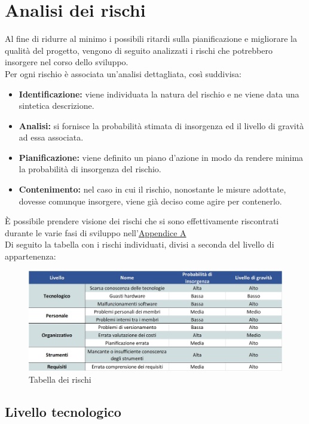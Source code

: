 \newpage
\section{Analisi dei rischi}

Al fine di ridurre al minimo i possibili ritardi sulla pianificazione e migliorare la qualità del progetto, vengono di seguito analizzati i rischi che potrebbero insorgere nel corso dello sviluppo.\\
Per ogni rischio è associata un'analisi dettagliata, così suddivisa:

\begin{itemize}
	\item \textbf{Identificazione:} viene individuata la natura del rischio e ne viene data una sintetica descrizione.
	\item \textbf{Analisi:} si fornisce la probabilità stimata di insorgenza ed il livello di gravità ad essa associata.
	\item \textbf{Pianificazione:} viene definito un piano d'azione in modo da rendere minima la probabilità di insorgenza del rischio. 
	\item \textbf{Contenimento:} nel caso in cui il rischio, nonostante le misure adottate, dovesse comunque insorgere, viene già deciso come agire per contenerlo.
\end{itemize}

È possibile prendere visione dei rischi che si sono effettivamente riscontrati durante le varie fasi di sviluppo nell'\hyperref[RiscontroRischi]{Appendice A}\\
Di seguito la tabella con i rischi individuati, divisi a seconda del livello di appartenenza:

\begin{figure}[h!]
	\centerline{\includegraphics[scale=0.50]{img/TabellaRischi.jpg}}
	\caption{Tabella dei rischi}
	\label{fig:tab_risc}
\end{figure}


\subsection{Livello tecnologico}
